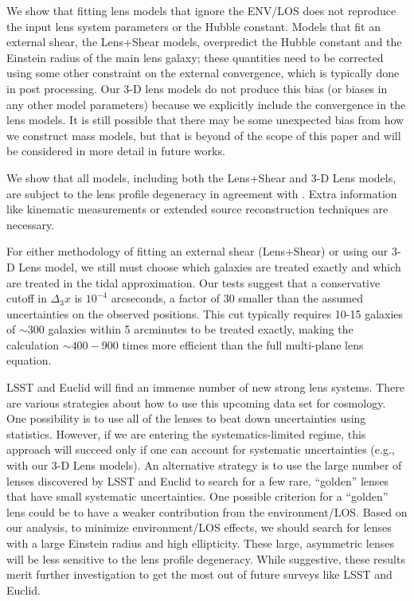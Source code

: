 \documentclass{emulateapj}
\begin{document}
We show that fitting lens models that ignore the ENV/LOS does not reproduce the input lens system parameters or the Hubble constant. Models that fit an external shear, the Lens+Shear models, overpredict the Hubble constant and the Einstein radius of the main lens galaxy; these quantities need to be corrected using some other constraint on the external convergence, which is typically done in post processing. Our 3-D lens models do not produce this bias (or biases in any other model parameters) because we explicitly include the convergence in the lens models. It is still possible that there may be some unexpected bias from how we construct mass models, but that is beyond of the scope of this paper and will be considered in more detail in future works. 

We show that all models, including both the Lens+Shear and 3-D Lens models, are subject to the lens profile degeneracy in agreement with \citet{Xu16, Schneider13, Sluse12}. Extra information like kinematic measurements or extended source reconstruction techniques are necessary.

For either methodology of fitting an external shear (Lens+Shear) or using our 3-D Lens model, we still must choose which galaxies are treated exactly and which are treated in the tidal approximation. Our tests suggest that a conservative cutoff in $\Delta_3 x$ is $10^{-4}$ arcseconds, a factor of 30 smaller than the assumed uncertainties on the observed positions. This cut typically requires 10-15 galaxies of $\sim 300$ galaxies within 5 arcminutes to be treated exactly, making the calculation $\sim 400-900$ times more efficient than the full multi-plane lens equation.

LSST and Euclid will find an immense number of new strong lens systems. There are various strategies about how to use this upcoming data set for cosmology. One possibility is to use all of the lenses to beat down uncertainties using statistics. However, if we are entering the systematics-limited regime, this approach will succeed only if one can account for systematic uncertainties (e.g., with our 3-D Lens models). An alternative strategy is to use the large number of lenses discovered by LSST and Euclid to search for a few rare, ``golden'' lenses that have small systematic uncertainties. One possible criterion for a ``golden'' lens could be to have a weaker contribution from the environment/LOS. Based on our analysis, to minimize environment/LOS effects, we should search for lenses with a large Einstein radius and high ellipticity. These large, asymmetric lenses will be less sensitive to the lens profile degeneracy. While suggestive, these results merit further investigation to get the most out of future surveys like LSST and Euclid.
\end{document}
